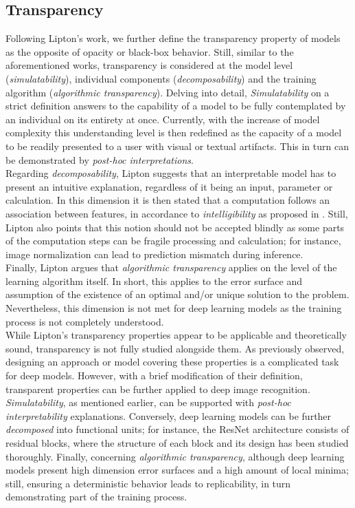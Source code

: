 \subsection{Transparency}
\label{rel:sub_transp}
Following Lipton's work, we further define the transparency property of models as the opposite of 
opacity or black-box behavior. Still, similar to the aforementioned works, transparency is 
considered at the model level (\emph{simulatability}), individual components 
(\emph{decomposability}) and the training algorithm (\emph{algorithmic transparency}). Delving into 
detail, \emph{Simulatability} on a strict definition answers to the capability of a model to be 
fully contemplated by an individual on its entirety at once. Currently, with the increase of model 
complexity this understanding level is then redefined as the capacity of a model to be readily 
presented to a user with visual or textual artifacts. This in turn can be demonstrated by 
\emph{post-hoc interpretations}.\\

\noindent Regarding \emph{decomposability}, Lipton suggests that an interpretable model has to present 
an intuitive explanation, regardless of it being an input, parameter or calculation. In this 
dimension it is then stated that a computation follows an association between features, in 
accordance to \emph{intelligibility} as proposed in \autocite{lou2012intelligible}. Still, Lipton 
also points that this notion should not be accepted blindly as some parts of the computation steps 
can be fragile processing and calculation; for instance, image normalization can lead to prediction 
mismatch during inference.\\

\noindent Finally, Lipton argues that \emph{algorithmic transparency} applies on the level of the 
learning algorithm itself. In short, this applies to the error surface and assumption of the 
existence of an optimal and/or unique solution to the problem. Nevertheless, this dimension is not 
met for deep learning models as the training process is not completely understood.\\

\noindent While Lipton's transparency properties appear to be applicable and theoretically sound, 
transparency is not fully studied alongside them. As previously observed, designing an approach or 
model covering these properties is a complicated task for deep models. However, with a brief 
modification of their definition, transparent properties can be further applied to deep image 
recognition. \emph{Simulatability}, as mentioned earlier,  can be supported with \emph{post-hoc 
interpretability} explanations. Conversely, deep learning models can be further 
\emph{decomposed} into functional units; for instance, the ResNet architecture consists of
residual blocks, where the structure of each block and its design has been studied thoroughly. 
Finally, concerning \emph{algorithmic transparency}, although deep learning models present high 
dimension error surfaces and a high amount of local minima; still, ensuring a deterministic 
behavior leads to replicability, in turn demonstrating part of the training process.\\

